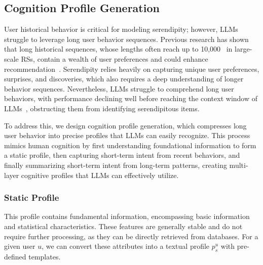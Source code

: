 \subsection{Cognition Profile Generation}
User historical behavior is critical for modeling serendipity; however, LLMs struggle to leverage long user behavior sequences. Previous research has shown that long historical sequences, whose lengths often reach up to 10,000~\cite{pi2020search,hou2024cross,si2024twin,feng2024context} in large-scale RSs, contain a wealth of user preferences and could enhance recommendation~\cite{pi2020search,qin2020user}.  Serendipity relies heavily on capturing unique user preferences, surprises, and discoveries, which also requires a deep understanding of longer behavior sequences. Nevertheless, LLMs struggle to comprehend long user behaviors, with performance declining well before reaching the context window of LLMs~\cite{lin2024rella}, obstructing them from identifying serendipitous items. 

To address this, we design cognition profile generation, which compresses long user behavior into precise profiles that LLMs can easily recognize. This process mimics human cognition by first understanding foundational information to form a static profile, then capturing short-term intent from recent behaviors, and finally summarizing short-term intent from long-term patterns, creating multi-layer cognitive profiles that LLMs can effectively utilize.

\subsubsection{Static Profile} This profile contains fundamental information, encompassing basic information and statistical characteristics. These features are generally stable and do not require further processing, as they can be directly retrieved from databases. For a given user $u$, we can convert these attributes into a textual profile $p_s^u$ with pre-defined templates.


